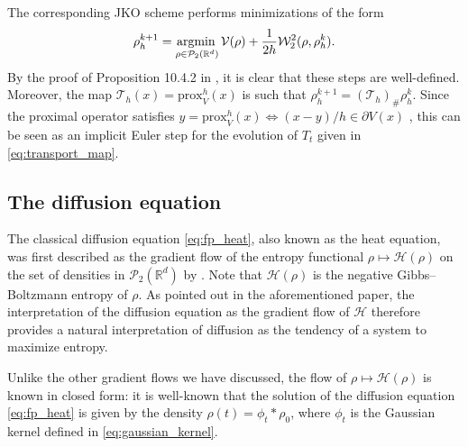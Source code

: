 \documentclass[final,12pt]{colt2018}
\newcommand{\was}{\mathcal{W}}
\newcommand{\argmin}{\operatornamewithlimits{argmin\,}}
\begin{document}
The corresponding JKO scheme performs minimizations of the form
\begin{equation}
\rho_h^{k+1} =  \argmin_{\rho \in \mathcal{P}_2(\mathbb{R}^d)} \mathcal{V}(\rho) + \frac{1}{2h}\was_2^2(\rho,\rho_h^{k}).
\end{equation}
By the proof of Proposition 10.4.2 in \citet{ambrosio2005}, it is clear that these steps are well-defined. Moreover, the map $\mathcal{T}_h(x) = \text{prox}_V^h(x)$ is such that $\rho_h^{k+1} =  (\mathcal{T}_h)_\#\rho_h^{k}$. Since the proximal operator satisfies 
$y = \text{prox}_V^h(x) \iff (x-y)/h \in \partial V(x)$ \citep[see e.g.][]{parikh2014proximal}, this can be seen as an implicit Euler step for the evolution of $T_t$ given in \eqref{eq:transport_map}.



\subsection{The diffusion equation}
The classical diffusion equation \eqref{eq:fp_heat}, also known as the heat equation, was first described as the gradient flow of the entropy functional $\rho \mapsto \mathcal{H}(\rho)$ on the set of densities in $\mathcal{P}_2(\mathbb{R}^d)$ by \citet{jordan1998variational}. Note that $\mathcal{H}(\rho)$ is the negative Gibbs--Boltzmann entropy of $\rho$. As pointed out in the aforementioned paper, the interpretation of the diffusion equation as the gradient flow of $\mathcal{H}$ therefore provides a natural interpretation of diffusion as the tendency of a system to maximize entropy. 

Unlike the other gradient flows we have discussed, the flow of $\rho \mapsto \mathcal{H}(\rho)$ is known in closed form: it is well-known that the solution of the diffusion equation \eqref{eq:fp_heat} is given by the density $\rho(t) = \phi_t * \rho_0$, where $\phi_t$ is the Gaussian kernel defined in \eqref{eq:gaussian_kernel}.
\end{document}
